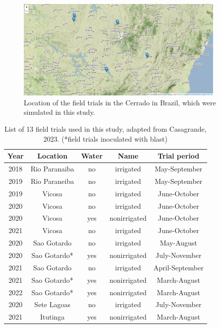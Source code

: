 \documentclass[11pt]{article}
\begin{document}
\begin{figure}[htbp]
\centering
\includegraphics[width=0.9\textwidth]{./figures/Brazil.png}
\caption{Location of the field trials in the Cerrado in Brazil, which were simulated in this study.}
\end{figure}

\begin{table}[htbp]
\caption{\label{list}List of 13 field trials used in this study, adapted from Casagrande, 2023. (*field trials inoculated with blast)}
\centering
\begin{tabular}{|ccccc|}
\hline
Year & Location & Water & Name & Trial period\\
\hline
\hline
2018 & Rio Paranaiba & no & irrigated & May-September\\
\hline
2019 & Rio Paraneiba & no & irrigated & May-September\\
\hline
2019 & Vicosa & no & irrigated & June-October\\
\hline
2020 & Vicosa & no & irrigated & June-October\\
\hline
2020 & Vicosa & yes & nonirrigated & June-October\\
\hline
2021 & Vicosa & no & irrigated & June-October\\
\hline
2020 & Sao Gotardo & no & irrigated & May-August\\
\hline
2020 & Sao Gotardo* & yes & nonirrigated & July-November\\
\hline
2021 & Sao Gotardo & no & irrigated & April-September\\
\hline
2021 & Sao Gotardo* & yes & nonirrigated & March-August\\
\hline
2022 & Sao Gotardo* & yes & nonirrigated & March-August\\
\hline
2020 & Sete Lagoas & no & irrigated & July-November\\
\hline
2021 & Itutinga & yes & nonirrigated & March-August\\
\hline
\end{tabular}
\end{table}
\end{document}
